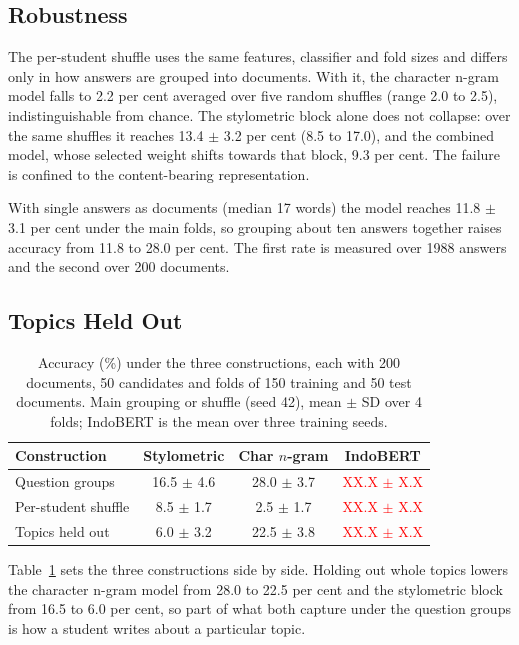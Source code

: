 \documentclass[conference]{IEEEtran}
\newcommand{\tbd}[1]{\textcolor{red}{#1}}
\begin{document}
\subsection{Robustness}

The per-student shuffle uses the same features, classifier and fold sizes and differs only in how answers are grouped into documents. With it, the character n-gram model falls to 2.2 per cent averaged over five random shuffles (range 2.0 to 2.5), indistinguishable from chance. The stylometric block alone does not collapse: over the same shuffles it reaches 13.4 $\pm$ 3.2 per cent (8.5 to 17.0), and the combined model, whose selected weight shifts towards that block, 9.3 per cent. The failure is confined to the content-bearing representation.

With single answers as documents (median 17 words) the model reaches 11.8 $\pm$ 3.1 per cent under the main folds, so grouping about ten answers together raises accuracy from 11.8 to 28.0 per cent. The first rate is measured over 1988 answers and the second over 200 documents.

\subsection{Topics Held Out}

\begin{table}[!t]
\caption{Accuracy (\%) under the three constructions, each with 200 documents, 50 candidates and folds of 150 training and 50 test documents. Main grouping or shuffle (seed 42), mean $\pm$ SD over 4 folds; IndoBERT is the mean over three training seeds.}
\label{tab:conditions}
\centering
\footnotesize
\setlength{\tabcolsep}{3pt}
\begin{tabular}{@{}lccc@{}}
\hline
Construction & Stylometric & Char $n$-gram & IndoBERT \\
\hline
Question groups      & 16.5 $\pm$ 4.6 & 28.0 $\pm$ 3.7 & \tbd{XX.X $\pm$ X.X} \\
Per-student shuffle  & 8.5 $\pm$ 1.7  & 2.5 $\pm$ 1.7  & \tbd{XX.X $\pm$ X.X} \\
Topics held out      & 6.0 $\pm$ 3.2  & 22.5 $\pm$ 3.8 & \tbd{XX.X $\pm$ X.X} \\
\hline
\end{tabular}
\end{table}

Table~\ref{tab:conditions} sets the three constructions side by side. Holding out whole topics lowers the character n-gram model from 28.0 to 22.5 per cent and the stylometric block from 16.5 to 6.0 per cent, so part of what both capture under the question groups is how a student writes about a particular topic.
\end{document}
